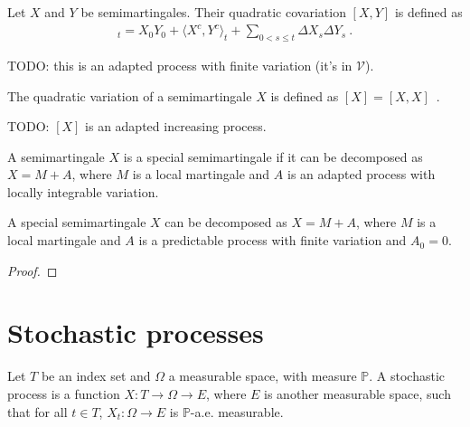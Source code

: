 \begin{definition}\label{def:quadCovariation}
Let $X$ and $Y$ be semimartingales. Their quadratic covariation $[X, Y]$ is defined as
\begin{align*}
  [X, Y]_t = X_0 Y_0 + \langle X^c, Y^c \rangle_t + \sum_{0 < s \le t} \Delta X_s \Delta Y_s
  \: .
\end{align*}
\end{definition}

TODO: this is an adapted process with finite variation (it's in $\mathcal{V}$).


\begin{definition}\label{def:quadVariation}
The quadratic variation of a semimartingale $X$ is defined as $[X] = [X, X]$~.
\end{definition}

TODO: $[X]$ is an adapted increasing process.


\begin{definition}\label{def:IsSpecialSemimartingale}
A semimartingale $X$ is a special semimartingale if it can be decomposed as $X = M + A$, where $M$ is a local martingale and $A$ is an adapted process with locally integrable variation.
\end{definition}


\begin{theorem}\label{lem:IsSpecialSemimartingale.decomposition}
A special semimartingale $X$ can be decomposed as $X = M + A$, where $M$ is a local martingale and $A$ is a predictable process with finite variation and $A_0 = 0$.
\end{theorem}

\begin{proof}

\end{proof}


\chapter{Stochastic processes}
\label{chap:process}

Let $T$ be an index set and $\Omega$ a measurable space, with measure $\mathbb{P}$.
A stochastic process is a function $X : T \to \Omega \to E$, where $E$ is another measurable space, such that for all $t \in T$, $X_t : \Omega \to E$ is $\mathbb{P}$-a.e. measurable.


